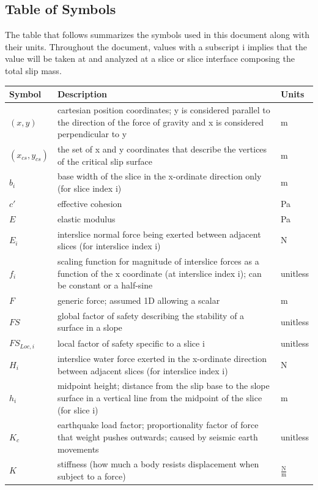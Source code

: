 \documentclass[12pt]{article}
\begin{document}
\subsection{Table of Symbols}
\label{Sec:ToS}
The table that follows summarizes the symbols used in this document along with their units. Throughout the document, values with a subscript i implies that the value will be taken at and analyzed at a slice or slice interface composing the total slip mass.
\begin{longtable*}{l l l}
\toprule
Symbol & Description & Units
\\
\midrule
$(x,y)$ & cartesian position coordinates; y is considered parallel to the direction of the force of gravity and x is considered perpendicular to y & m
\\
$({x_{cs}},{y_{cs}})$ & the set of x and y coordinates that describe the vertices of the critical slip surface & m
\\
$b_{i}$ & base width of the slice in the x-ordinate direction only (for slice index i) & m
\\
$c'$ & effective cohesion & Pa
\\
$E$ & elastic modulus & Pa
\\
$E_{i}$ & interslice normal force being exerted between adjacent slices (for interslice index i) & N
\\
$f_{i}$ & scaling function for magnitude of interslice forces as a function of the x coordinate (at interslice index i); can be constant or a half-sine & unitless
\\
$F$ & generic force; assumed 1D allowing a scalar & m
\\
$FS$ & global factor of safety describing the stability of a surface in a slope & unitless
\\
$FS_{Loc,i}$ & local factor of safety specific to a slice i & unitless
\\
$H_{i}$ & interslice water force exerted in the x-ordinate direction between adjacent slices (for interslice index i) & N
\\
$h_{i}$ & midpoint height; distance from the slip base to the slope surface in a vertical line from the midpoint of the slice (for slice i) & m
\\
$K_{c}$ & earthquake load factor; proportionality factor of force that weight pushes outwards; caused by seismic earth movements & unitless
\\
$K$ & stiffness (how much a body resists displacement when subject to a force) & $\frac{\text{N}}{\text{m}}$
\\

\end{longtable*}
\end{document}
